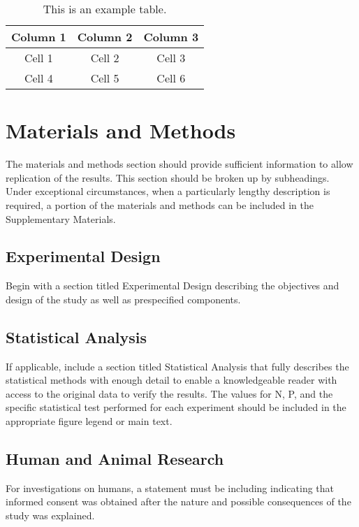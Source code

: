 \documentclass{article}
\begin{document}
\begin{table}[b]
    \caption{This is an example table.}    
    \centering
    \begin{tabular}{ccc}
            \hline
            Column 1 & Column 2 & Column 3 \\  
            \hline
            Cell 1 & Cell 2 & Cell 3\\ 
            Cell 4 & Cell 5 & Cell 6 \\
            \hline
            \end{tabular}

    \label{tab:1}
\end{table}

\section{Materials and Methods}
The materials and methods section should provide sufficient information to allow replication of the results. This section should be broken up by subheadings. Under exceptional circumstances, when a particularly lengthy description is required, a portion of the materials and methods can be included in the Supplementary Materials. 

\subsection{Experimental Design}
Begin with a section titled Experimental Design describing the objectives and design of the study as well as prespecified components. 

\subsection{Statistical Analysis}
If applicable, include a section titled Statistical Analysis that fully describes the statistical methods with enough detail to enable a knowledgeable reader with access to the original data to verify the results. The values for N, P, and the specific statistical test performed for each experiment should be included in the appropriate figure legend or main text. 

\subsection{Human and Animal Research}
For investigations on humans, a statement must be including indicating that informed consent was obtained after the nature and possible consequences of the study was explained.
\end{document}
